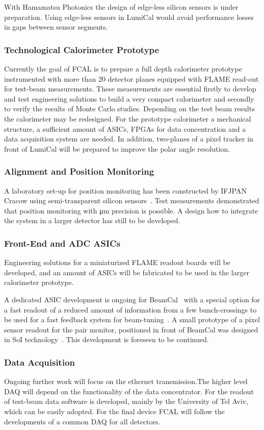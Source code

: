 With Hamamatsu Photonics the design of 
edge-less silicon sensors is under preparation. Using edge-less sensors in LumiCal would avoid performance losses 
in gaps between sensor segments.

\subsubsection{Technological Calorimeter Prototype}

Currently the goal of FCAL is to prepare a full depth calorimeter prototype instrumented with more than 20
detector planes equipped with FLAME read-out for test-beam measurements. These measurements
are essential firstly to develop and test engineering solutions to build a very compact calorimeter and
secondly to verify the results of Monte Carlo studies. Depending on the test beam
results the calorimeter may be redesigned.
For the prototype calorimeter
a mechanical structure, a sufficient amount of ASICs, FPGAs for
data concentration and
a data acquisition system are needed. In addition, 
two-planes of a pixel tracker in front of LumiCal will be prepared to improve the polar angle resolution.

\subsubsection{Alignment and Position Monitoring }

A laboratory set-up for position monitoring has been constructed by IFJPAN Cracow using semi-transparent
silicon sensors~\cite{EUDETREPORT-2008-05}. Test measurements demonstrated that position monitoring 
with \si{\micro\meter} precision is possible. A design how to integrate the system in a larger detector has still to be developed. 

\subsubsection{Front-End and ADC ASICs}

Engineering solutions for a miniaturized FLAME readout boards will be developed, and an amount of ASICs will be fabricated
to be used in the larger calorimeter prototype.

A dedicated ASIC development is ongoing for BeamCal~\cite{6200898}
with a special option for a fast readout of a reduced amount of
information from a few bunch-crossings to be used for a fast feedback system for beam-tuning~\cite{1748-0221-3-10-P10004}.
A small prototype of a pixel sensor readout for the pair monitor, positioned in front of BeamCal was designed in SoI
technology~\cite{Sato201153}. This development is foreseen to be continued.

\subsubsection{Data Acquisition}

Ongoing further work will focus on the ethernet transmission.The higher level DAQ will depend on the functionality of the 
data concentrator. For the readout of test-beam data software is developed, mainly by the University of Tel Aviv,
which can be easily adopted. For the final device FCAL will follow the developments of a common DAQ for all detectors.
